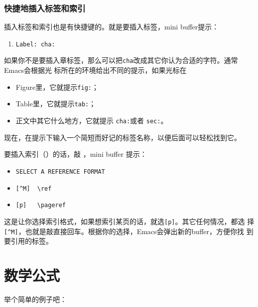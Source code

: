 \subsubsection*{快捷地插入标签和索引}

插入标签和索引也是有快捷键的。就是要插入标签，mini
buffer提示：

\begin{enumerate}
\item[] \texttt{Label: cha:}
\end{enumerate}

如果你不是要插入章标签，那么可以把\texttt{cha}改成其它你认为合适的字符。通常Emacs会根据光
标所在的环境给出不同的提示，如果光标在

\begin{itemize}
\item Figure里，它就提示\texttt{fig:}；
\item Table里，它就提示\texttt{tab:}；
\item 正文中其它什么地方，它就提示 \texttt{cha:}或者 \texttt{sec:}。
\end{itemize}

现在，在提示下输入一个简短而好记的标签名称，以便后面可以轻松找到它。

要插入索引（\ltx{\ref{}}）的话，敲 ，mini buffer 提示：

\begin{itemize}
\item[] \texttt{SELECT A REFERENCE FORMAT}
\item[] \verb'[^M]  \ref'
\item[] \verb'[p]   \pageref' 
\end{itemize}

这是让你选择索引格式，如果想索引某页的话，就选\texttt{[p]}。其它任何情况，都选
择\verb'[^M]'，也就是敲\LKeyEnter{}直接回车。根据你的选择，Emacs会弹出新的buffer，方便你找
到要引用的标签。

\section{数学公式}
\label{sec:math}

举个简单的例子吧：

\begin{codeblock}[.9]
\end{codeblock}

